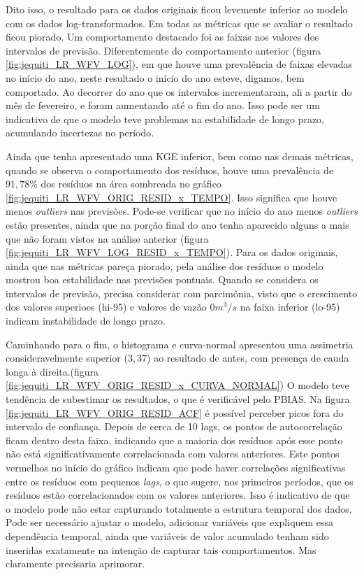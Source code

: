 Dito isso, o resultado para os dados originais ficou levemente inferior ao modelo com os dados log-transformados. Em todas as métricas que se avaliar o resultado ficou piorado. Um comportamento destacado foi as faixas nos valores dos intervalos de previsão. Diferentemente do comportamento anterior (figura \ref{fig:jequiti_LR_WFV_LOG}), em que houve uma prevalência de faixas elevadas no início do ano, neste resultado o início do ano esteve, digamos, bem comportado. Ao decorrer do ano que os intervalos incrementaram, ali a partir do mês de fevereiro, e foram aumentando até o fim do ano. Isso pode ser um indicativo de que o modelo teve problemas na estabilidade de longo prazo, acumulando incertezas no período.

Ainda que tenha apresentado uma KGE inferior, bem como nas demais métricas, quando se observa o comportamento dos resíduos, houve uma prevalência de $91,78\%$ dos resíduos na área sombreada no gráfico \ref{fig:jequiti_LR_WFV_ORIG_RESID_x_TEMPO}. Isso significa que houve menos \textit{outliers} nas previsões. Pode-se verificar que no início do ano menos \textit{outliers} estão presentes, ainda que na porção final do ano tenha aparecido alguns a mais que não foram vistos na análise anterior (figura \ref{fig:jequiti_LR_WFV_LOG_RESID_x_TEMPO}). Para os dados originais, ainda que nas métricas pareça piorado, pela análise dos resíduos o modelo mostrou boa estabilidade nas previsões pontuais. Quando se considera os intervalos de previsão, precisa considerar com parcimônia, visto que o crescimento dos valores superioes (hi-95) e valores de vazão $0 m^3/s$ na faixa inferior (lo-95) indicam instabilidade de longo prazo.

Caminhando para o fim, o histograma e curva-normal apresentou uma assimetria consideravelmente superior ($3,37$) ao resultado de antes, com presença de cauda longa à direita.(figura \ref{fig:jequiti_LR_WFV_ORIG_RESID_x_CURVA_NORMAL}) O modelo teve tendência de subestimar os resultados, o que é verificável pelo PBIAS. Na figura \ref{fig:jequiti_LR_WFV_ORIG_RESID_ACF} é possível perceber picos fora do intervalo de confiança. Depois de cerca de 10 lags, os pontos de autocorrelação ficam dentro desta faixa, indicando que a maioria dos resíduos após esse ponto não está significativamente correlacionada com valores anteriores. Este pontos vermelhos no início do gráfico indicam que pode haver correlações significativas entre os resíduos com pequenos \textit{lags}, o que sugere, nos primeiros períodos, que os resíduos estão correlacionados com os valores anteriores. Isso é indicativo de que o modelo pode não estar capturando totalmente a estrutura temporal dos dados. Pode ser necessário ajustar o modelo, adicionar variáveis que expliquem essa dependência temporal, ainda que variáveis de valor acumulado tenham sido inseridas exatamente na intenção de capturar tais comportamentos. Mas claramente precisaria aprimorar.

